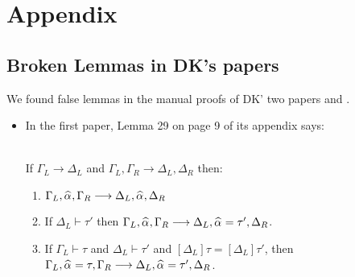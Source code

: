 
\section{Appendix}

\subsection{Broken Lemmas in DK's papers}
\label{appendix:false_lemmas}

We found false lemmas in the manual proofs of DK' two papers
\cite{dunfield2013complete} and \cite{DunfieldIndexed}.
\begin{itemize}
    \item
        In the first paper, Lemma 29 on page 9 of its appendix says:
        \begin{lemma}~\\
        If $\Gamma_L \longrightarrow \Delta_L$ and
        $\Gamma_L, \Gamma_R \longrightarrow \Delta_L, \Delta_R$ then:
        \begin{enumerate}
            \item $\Gamma_L,\al,\Gamma_R \longrightarrow \Delta_L, \al, \Delta_R$
            \item If $\Delta_L \vdash \tau'$ then
                $\Gamma_L,\al,\Gamma_R \longrightarrow \Delta_L, \al = \tau', \Delta_R$.
            \item If $\Gamma_L \vdash \tau$ and $\Delta_L \vdash \tau'$ and
                $[\Delta_L]\tau = [\Delta_L]\tau'$, then
                $\Gamma_L, \al = \tau, \Gamma_R \longrightarrow \Delta_L, \al = \tau', \Delta_R$.
        \end{enumerate}
        \end{lemma}


\end{itemize}
